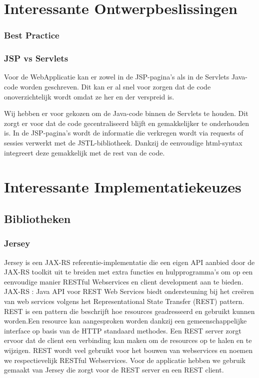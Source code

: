 \documentclass[pdftex,a4paper,12pt,twoside]{report}
\begin{document}
\chapter{Interessante Ontwerpbeslissingen}
\subsection{Best Practice}
\subsection{JSP vs Servlets}
Voor de WebApplicatie kan er zowel in de JSP-pagina's als in de Servlets Java-code worden geschreven. Dit kan er al snel voor zorgen dat de code onoverzichtelijk wordt omdat ze her en der verspreid is.

Wij hebben er voor gekozen om de Java-code binnen de Servlets te houden. Dit zorgt er voor dat de code gecentraliseerd blijft en gemakkelijker te onderhouden is. In de JSP-pagina's wordt de informatie die verkregen wordt via requests of sessies verwerkt met de JSTL-bibliotheek. Dankzij de eenvoudige html-syntax integreert deze gemakkelijk met de rest van de code.

\chapter{Interessante Implementatiekeuzes}
\section{Bibliotheken}
\subsection{Jersey}

Jersey is een JAX-RS referentie-implementatie die een eigen API aanbied door de JAX-RS toolkit uit te breiden met extra functies en hulpprogramma's om op een eenvoudige manier RESTful Webservices en client development aan te bieden.
JAX-RS : Java API voor REST Web Services biedt ondersteuning bij het creëren van web services volgens het Representational State Transfer (REST) pattern.
REST is een pattern die beschrijft hoe resources geadresseerd en gebruikt kunnen worden.Een resource kan aangesproken worden dankzij een gemeenschappelijke interface op basis van de HTTP standaard methodes.
Een REST server zorgt ervoor dat de client een verbinding kan maken om de resources op te halen en te wijzigen. REST wordt veel gebruikt voor het bouwen van webservices en noemen we respectievelijk RESTful Webservices.
Voor de applicatie hebben we gebruik gemaakt van Jersey die zorgt voor de REST server en een REST client.
\end{document}
